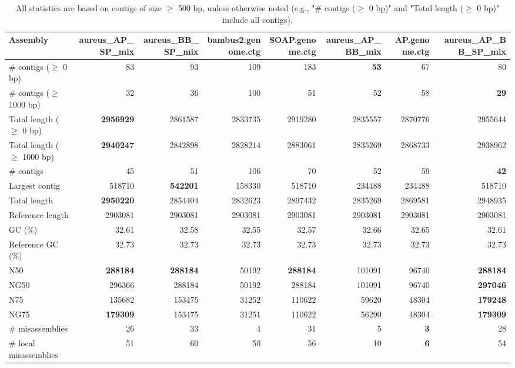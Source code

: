 \documentclass[12pt,a4paper]{article}
\begin{document}
\begin{table}[ht]
\begin{center}
\caption{All statistics are based on contigs of size $\geq$ 500 bp, unless otherwise noted (e.g., "\# contigs ($\geq$ 0 bp)" and "Total length ($\geq$ 0 bp)" include all contigs).}
\begin{tabular}{|l*{7}{|r}|}
\hline
Assembly & aureus\_AP\_SP\_mix & aureus\_BB\_SP\_mix & bambus2.genome.ctg & SOAP.genome.ctg & aureus\_AP\_BB\_mix & AP.genome.ctg & aureus\_AP\_BB\_SP\_mix \\ \hline
\# contigs ($\geq$ 0 bp) & 83 & 93 & 109 & 183 & {\bf 53} & 67 & 80 \\ \hline
\# contigs ($\geq$ 1000 bp) & 32 & 36 & 100 & 51 & 52 & 58 & {\bf 29} \\ \hline
Total length ($\geq$ 0 bp) & {\bf 2956929} & 2861587 & 2833735 & 2919280 & 2835557 & 2870776 & 2955644 \\ \hline
Total length ($\geq$ 1000 bp) & {\bf 2940247} & 2842898 & 2828214 & 2883061 & 2835269 & 2868733 & 2938962 \\ \hline
\# contigs & 45 & 51 & 106 & 70 & 52 & 59 & {\bf 42} \\ \hline
Largest contig & 518710 & {\bf 542201} & 158330 & 518710 & 234488 & 234488 & 518710 \\ \hline
Total length & {\bf 2950220} & 2854404 & 2832623 & 2897432 & 2835269 & 2869581 & 2948935 \\ \hline
Reference length & 2903081 & 2903081 & 2903081 & 2903081 & 2903081 & 2903081 & 2903081 \\ \hline
GC (\%) & 32.61 & 32.58 & 32.55 & 32.57 & 32.66 & 32.65 & 32.61 \\ \hline
Reference GC (\%) & 32.73 & 32.73 & 32.73 & 32.73 & 32.73 & 32.73 & 32.73 \\ \hline
N50 & {\bf 288184} & {\bf 288184} & 50192 & {\bf 288184} & 101091 & 96740 & {\bf 288184} \\ \hline
NG50 & 296366 & 288184 & 50192 & 288184 & 101091 & 96740 & {\bf 297046} \\ \hline
N75 & 135682 & 153475 & 31252 & 110622 & 59620 & 48304 & {\bf 179248} \\ \hline
NG75 & {\bf 179309} & 153475 & 31251 & 110622 & 56290 & 48304 & {\bf 179309} \\ \hline
\# misassemblies & 26 & 33 & 4 & 31 & 5 & {\bf 3} & 28 \\ \hline
\# local misassemblies & 51 & 60 & 50 & 56 & 10 & {\bf 6} & 54 \\ \hline

\end{tabular}
\end{center}
\end{table}
\end{document}
